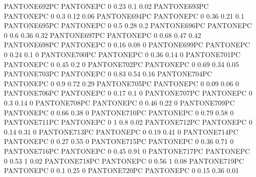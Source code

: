  {PANTONE692PC} {PANTONE\SpotSpace PC} {0 0.23 0.1 0.02}
 {PANTONE693PC} {PANTONE\SpotSpace PC} {0 0.3 0.12 0.06}
 {PANTONE694PC} {PANTONE\SpotSpace PC} {0 0.36 0.21 0.1}
 {PANTONE695PC} {PANTONE\SpotSpace PC} {0 0.5 0.28 0.2}
 {PANTONE696PC} {PANTONE\SpotSpace PC} {0 0.6 0.36 0.32}
 {PANTONE697PC} {PANTONE\SpotSpace PC} {0 0.68 0.47 0.42}
 {PANTONE698PC} {PANTONE\SpotSpace PC} {0 0.16 0.08 0}
 {PANTONE699PC} {PANTONE\SpotSpace PC} {0 0.24 0.1 0}
 {PANTONE700PC} {PANTONE\SpotSpace PC} {0 0.36 0.14 0}
 {PANTONE701PC} {PANTONE\SpotSpace PC} {0 0.45 0.2 0}
 {PANTONE702PC} {PANTONE\SpotSpace PC} {0 0.69 0.34 0.05}
 {PANTONE703PC} {PANTONE\SpotSpace PC} {0 0.83 0.54 0.16}
 {PANTONE704PC} {PANTONE\SpotSpace PC} {0 0.9 0.72 0.29}
 {PANTONE705PC} {PANTONE\SpotSpace PC} {0 0.09 0.06 0}
 {PANTONE706PC} {PANTONE\SpotSpace PC} {0 0.17 0.1 0}
 {PANTONE707PC} {PANTONE\SpotSpace PC} {0 0.3 0.14 0}
 {PANTONE708PC} {PANTONE\SpotSpace PC} {0 0.46 0.22 0}
 {PANTONE709PC} {PANTONE\SpotSpace PC} {0 0.66 0.38 0}
 {PANTONE710PC} {PANTONE\SpotSpace PC} {0 0.79 0.58 0}
 {PANTONE711PC} {PANTONE\SpotSpace PC} {0 1 0.8 0.02}
 {PANTONE712PC} {PANTONE\SpotSpace PC} {0 0.14 0.31 0}
 {PANTONE713PC} {PANTONE\SpotSpace PC} {0 0.19 0.41 0}
 {PANTONE714PC} {PANTONE\SpotSpace PC} {0 0.27 0.55 0}
 {PANTONE715PC} {PANTONE\SpotSpace PC} {0 0.36 0.71 0}
 {PANTONE716PC} {PANTONE\SpotSpace PC} {0 0.45 0.91 0}
 {PANTONE717PC} {PANTONE\SpotSpace PC} {0 0.53 1 0.02}
 {PANTONE718PC} {PANTONE\SpotSpace PC} {0 0.56 1 0.08}
 {PANTONE719PC} {PANTONE\SpotSpace PC} {0 0.1 0.25 0}
 {PANTONE720PC} {PANTONE\SpotSpace PC} {0 0.15 0.36 0.01}
